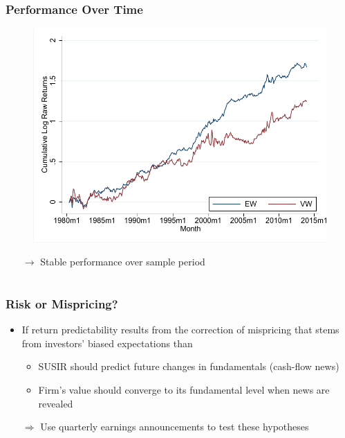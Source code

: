 \documentclass{beamer}
\begin{document}
	
\begin{frame}

\frametitle{Performance Over Time}

\begin{figure}[htbp]
\centering
	\includegraphics[scale=0.7,trim=4 4 4 4,clip]{figures/cumLS_susir_both_11.pdf} 
	\label{tab:cumLS}%
\end{figure}
\begin{itemize}
\vspace*{-0.7cm}
\item[$\rightarrow$] Stable performance over sample period
\end{itemize}
\end{frame}


\section{}
\begin{frame}
	\frametitle{Risk or Mispricing?}
\begin{itemize}
\item If return predictability results from the correction of mispricing that stems from investors' biased expectations than
	\begin{itemize}
		\item SUSIR should predict future changes in fundamentals (cash-flow news)
		\item Firm's value should converge to its fundamental level when news are revealed
	\end{itemize}
\item[$\Rightarrow$] Use quarterly earnings announcements to test these hypotheses
\end{itemize}
\end{frame}
\end{document}
